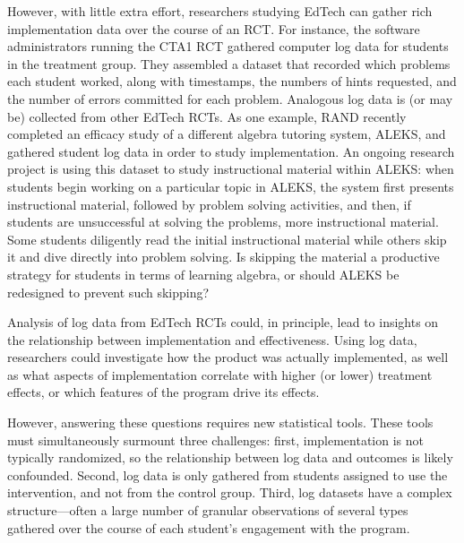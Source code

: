 \documentclass{article}\usepackage[]{graphicx}\usepackage[]{color}
\begin{document}
However, with little extra effort, researchers studying EdTech can
gather rich implementation data over the course of an RCT.
For instance, the software administrators running the CTA1 RCT
gathered computer log data for students in the treatment group.
They assembled a dataset that recorded which problems each student
worked, along with timestamps, the numbers of hints requested, and the
number of errors committed for each problem.
Analogous log data is (or may be) collected from other EdTech RCTs.
As one example, RAND recently
completed an efficacy study of a different algebra tutoring system,
ALEKS, and gathered student log data in order to study
implementation.
An ongoing research project is using this dataset to
study instructional material within ALEKS: when students begin working on a particular topic in ALEKS, the
system first presents instructional material, followed by problem
solving activities, and then, if students are unsuccessful at solving
the problems, more instructional material. Some students diligently
read the initial instructional material while others skip it and dive
directly into problem solving. Is skipping the material a productive
strategy for students in terms of learning algebra, or should ALEKS be
redesigned to prevent such skipping? %

Analysis of log data from EdTech RCTs could, in principle, lead to
insights on the relationship between implementation and effectiveness.
Using log data, researchers could investigate how the product was
actually implemented, as well as what aspects of implementation
correlate with higher (or lower) treatment effects, or which features
of the program drive its effects.

However, answering these questions requires new statistical tools.
These tools must simultaneously surmount three challenges: first,
implementation is not typically randomized, so the relationship
between log data and outcomes is likely confounded. Second,
log data is only gathered from students assigned to use the
intervention, and not from the control group. Third, log datasets have
a complex structure---often a large number of granular observations of several types
gathered over the course of each student's engagement with the
program.
\end{document}
